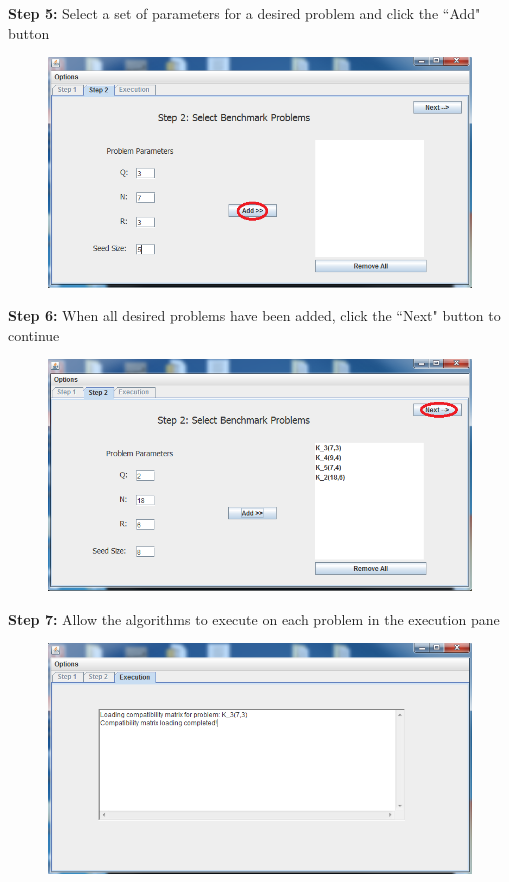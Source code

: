 \documentclass[titlepage]{article}
\begin{document}
\textbf{Step 5:} Select a set of parameters for a desired problem and click the ``Add" button

\begin{figure}[H]
\centering
\includegraphics[width=160mm]{Images/guiSteps/step5.png}
\end{figure}

\textbf{Step 6:} When all desired problems have been added, click the ``Next" button to continue

\begin{figure}[H]
\centering
\includegraphics[width=150mm]{Images/guiSteps/step6.png}
\end{figure}

\textbf{Step 7:} Allow the algorithms to execute on each problem in the execution pane

\begin{figure}[H]
\centering
\includegraphics[width=160mm]{Images/guiSteps/step7.png}
\end{figure}
\end{document}
